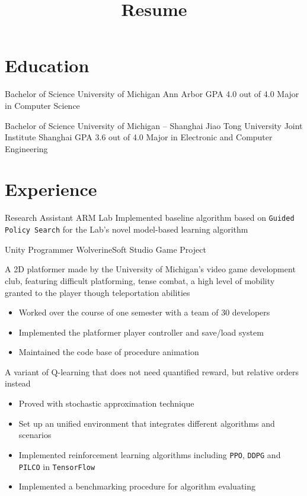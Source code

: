 \documentclass[10pt, a4paper, sans]{moderncv}
\title{Resume}
\begin{document}
\makecvtitle

\section{Education}
{Bachelor of Science}
{University of Michigan}
{Ann Arbor}
{GPA 4.0 out of 4.0}
{Major in Computer Science \\
	}

{Bachelor of Science}
{University of Michigan -- Shanghai Jiao Tong University Joint Institute}
{Shanghai}
{GPA 3.6 out of 4.0}
{Major in Electronic and Computer Engineering \\
	}

\section{Experience}
{Research Assistant}
{ARM Lab}
{}{}
{Implemented baseline algorithm based on \texttt{Guided Policy Search} for the Lab's novel model-based learning algorithm}

{Unity Programmer}
{WolverineSoft Studio Game Project}
{}{}
{A 2D platformer made by the University of Michigan's video game development club,
	featuring difficult platforming, tense combat, a high level of mobility granted to the player though teleportation abilities
	\begin{itemize}
		\item Worked over the course of one semester with a team of 30 developers
		\item Implemented the platformer player controller and save/load system
		\item Maintained the code base of procedure animation
	\end{itemize}
}

{
	A variant of Q-learning that does not need quantified reward, but relative orders instead
	\begin{itemize}
		\item Proved with stochastic approximation technique
	\end{itemize}
}
{
	\begin{itemize}
		\item Set up an unified environment that integrates different algorithms and scenarios
		\item Implemented reinforcement learning algorithms including \texttt{PPO}, \texttt{DDPG} and \texttt{PILCO} in \texttt{TensorFlow}
		\item Implemented a benchmarking procedure for algorithm evaluating
	\end{itemize}
}
\end{document}
